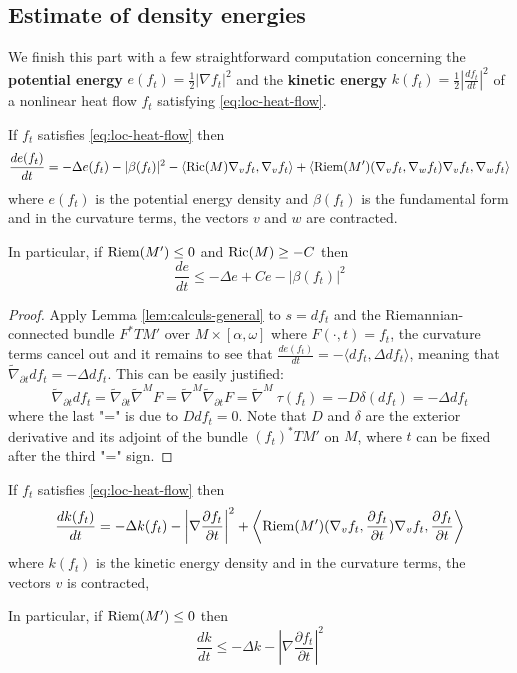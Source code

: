 \subsection{Estimate of density energies}
\label{sec:org56537f7}
We finish this part with a few straightforward computation concerning the \textbf{potential
energy} \(e(f_t) = \frac{1}{2}|\nabla f_t|^2\) and the \textbf{kinetic energy} \(k(f_t) =
\frac{1}{2}|\frac{d f_t}{d t}|^2\) of a nonlinear heat flow \(f_t\)
satisfying \eqref{eq:loc-heat-flow}.

\begin{theorem}
\label{thm:den-pot}
If \(f_t\) satisfies \eqref{eq:loc-heat-flow} then 
\[
 \frac{d e(f_t)}{dt}= -\Delta e(f_t) - |\beta(f_t)|^2 - \left\langle \mathop{\rm Ric}\nolimits(M) \nabla_v
f_t,\nabla_v f_t \rangle + \langle \mathop{\rm Riem}\nolimits(M') (\nabla_v f_t,\nabla_w f_t)\nabla_v
f_t,\nabla_w f_t \right\rangle
\]
where \(e(f_t)\) is the potential energy density and \(\beta(f_t)\) is the fundamental
form and in the curvature terms, the vectors \(v\) and \(w\) are contracted.

In particular, if  \(\mathop{\rm Riem}\nolimits(M') \leq 0\) and \(\mathop{\rm Ric}\nolimits(M)\geq -C\) then
\begin{equation}
\label{eq:den-pot-est}
\frac{d e}{dt} \leq -\Delta e + Ce - |\beta(f_t)|^2
\end{equation}
\end{theorem}
\begin{proof}
Apply Lemma \ref{lem:calculs-general} to \(s = d f_t\) and the Riemannian-connected
bundle \(F^* TM'\) over \(M\times [\alpha,\omega]\) where \(F(\cdot,t) = f_t\), the curvature terms cancel
out and it remains to see that
\(\frac{d e(f_t)}{dt}= - \langle df_t, \Delta df_t \rangle\), meaning that \(\tilde \nabla_{\partial t} df_t = -\Delta df_t\). This can be easily
justified:
\[
\tilde \nabla_{\partial t} df_t = \tilde \nabla_{\partial t} \tilde\nabla^M F=  \tilde\nabla^M
\tilde\nabla_{\partial t} F= \tilde\nabla^M\ \tau (f_t) = -D\delta (df_t) = -\Delta df_t
\]
where the last "=" is due to \(D df_t = 0\). Note that \(D\) and \(\delta\)
are the exterior derivative and its adjoint of the bundle \((f_t)^*TM'\) on \(M\),
where \(t\) can be fixed after the third "=" sign.
\end{proof}

\begin{theorem}
\label{thm:den-kin}
If \(f_t\) satisfies \eqref{eq:loc-heat-flow} then 
\[
 \frac{d k(f_t)}{dt}= -\Delta k(f_t) - \left|\nabla \frac{\partial f_t}{\partial t}\right|^2 +
\left\langle \mathop{\rm Riem}\nolimits(M') (\nabla_v f_t,\frac{\partial f_t}{\partial t})\nabla_v
f_t,\frac{\partial f_t}{\partial t} \right\rangle
\]
where \(k(f_t)\) is the kinetic energy density and in the curvature terms, the vectors \(v\) is contracted,

In particular, if  \(\mathop{\rm Riem}\nolimits(M') \leq 0\) then
\begin{equation}
\label{eq:den-kin-est}
\frac{d k}{dt} \leq -\Delta k  - \left|\nabla \frac{\partial f_t}{\partial t}\right|^2
\end{equation}
\end{theorem}


